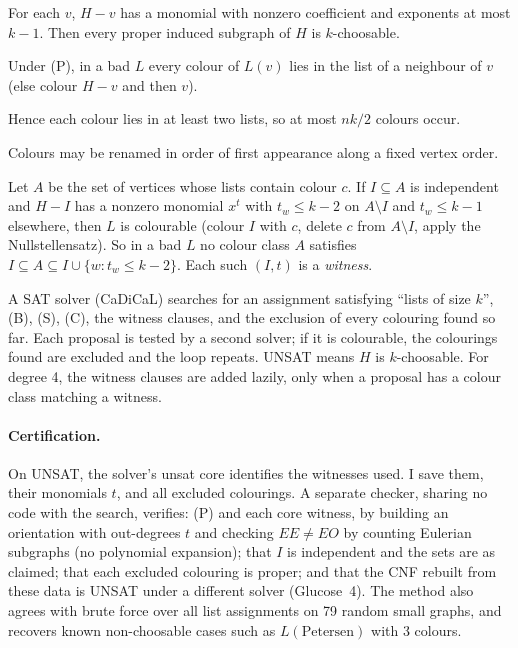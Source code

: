 \documentclass[11pt]{article}
\theoremstyle{plain}
\theoremstyle{definition}
\theoremstyle{remark}
\begin{document}
\begin{description}[leftmargin=1.2em,font=\normalfont\bfseries]
  \item[(P)] For each $v$, $H - v$ has a monomial with nonzero coefficient and exponents at most
        $k-1$. Then every proper induced subgraph of $H$ is $k$-choosable.
  \item[(C)] Under (P), in a bad $L$ every colour of $L(v)$ lies in the list of a neighbour of $v$
        (else colour $H - v$ and then $v$).
  \item[(B)] Hence each colour lies in at least two lists, so at most $nk/2$ colours occur.
  \item[(S)] Colours may be renamed in order of first appearance along a fixed vertex order.
  \item[(R)] Let $A$ be the set of vertices whose lists contain colour $c$. If $I \subseteq A$ is
        independent and $H - I$ has a nonzero monomial $x^t$ with $t_w \le k-2$ on $A \setminus I$
        and $t_w \le k-1$ elsewhere, then $L$ is colourable (colour $I$ with $c$, delete $c$
        from $A \setminus I$, apply the Nullstellensatz). So in a bad $L$ no colour class $A$
        satisfies $I \subseteq A \subseteq I \cup \{w : t_w \le k-2\}$. Each such $(I, t)$ is a
        \emph{witness}.
\end{description}

A SAT solver (CaDiCaL) searches for an assignment satisfying ``lists of size $k$'', (B), (S),
(C), the witness clauses, and the exclusion of every colouring found so far. Each proposal is
tested by a second solver; if it is colourable, the colourings found are excluded and the loop
repeats. UNSAT means $H$ is $k$-choosable. For degree 4, the witness clauses are added lazily,
only when a proposal has a colour class matching a witness.

\paragraph{Certification.} On UNSAT, the solver's unsat core identifies the witnesses used. I
save them, their monomials $t$, and all excluded colourings. A separate checker, sharing no code
with the search, verifies: (P) and each core witness, by building an orientation with
out-degrees $t$ and checking $EE \ne EO$ by counting Eulerian subgraphs (no polynomial
expansion); that $I$ is independent and the sets are as claimed; that each excluded colouring is
proper; and that the CNF rebuilt from these data is UNSAT under a different solver (Glucose~4).
The method also agrees with brute force over all list assignments on 79 random small graphs,
and recovers known non-choosable cases such as $L(\text{Petersen})$ with 3 colours.
\end{document}
